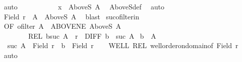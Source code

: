 \begin{isabellebody}
\ auto\isanewline
\ \ \ \isacommand{{\isacharbraceright}{\kern0pt}}\isamarkupfalse%
\isanewline
\ \ \ \isamarkupfalse%
\ {\isacharasterisk}{\kern0pt}\ \isamarkupfalse%
\ {\isachardoublequoteopen}x\ {\isasymin}\ AboveS\ A{\isachardoublequoteclose}\ \isamarkupfalse%
\ AboveS{\isacharunderscore}{\kern0pt}def\ \isamarkupfalse%
\ auto\isanewline
\ \ \isacommand{{\isacharbraceright}{\kern0pt}}\isamarkupfalse%
\isanewline
\ \ \isamarkupfalse%
\ {\isachardoublequoteopen}Field\ r\ {\isasymle}\ A\ {\isasymunion}\ {\isacharparenleft}{\kern0pt}AboveS\ A{\isacharparenright}{\kern0pt}{\isachardoublequoteclose}\ \isamarkupfalse%
\ blast\isanewline
{}\isamarkupfalse%
%
\endisatagproof
{\isafoldproof}%
%
\isadelimproof
\isanewline
%
\endisadelimproof
\isanewline
{}\isamarkupfalse%
\ suc{\isacharunderscore}{\kern0pt}ofilter{\isacharunderscore}{\kern0pt}in{\isacharcolon}{\kern0pt}\isanewline
{}\ OF{\isacharcolon}{\kern0pt}\ {\isachardoublequoteopen}ofilter\ A{\isachardoublequoteclose}\ \ ABOVE{\isacharunderscore}{\kern0pt}NE{\isacharcolon}{\kern0pt}\ {\isachardoublequoteopen}AboveS\ A\ {\isasymnoteq}\ {\isacharbraceleft}{\kern0pt}{\isacharbraceright}{\kern0pt}{\isachardoublequoteclose}\ \isanewline
\ \ \ \ \ \ \ \ REL{\isacharcolon}{\kern0pt}\ {\isachardoublequoteopen}{\isacharparenleft}{\kern0pt}b{\isacharcomma}{\kern0pt}suc\ A{\isacharparenright}{\kern0pt}\ {\isasymin}\ r{\isachardoublequoteclose}\ \ DIFF{\isacharcolon}{\kern0pt}\ {\isachardoublequoteopen}b\ {\isasymnoteq}\ suc\ A{\isachardoublequoteclose}\isanewline
{}\ {\isachardoublequoteopen}b\ {\isasymin}\ A{\isachardoublequoteclose}\isanewline
%
\isadelimproof
%
\endisadelimproof
%
\isatagproof
{}\isamarkupfalse%
{\isacharminus}{\kern0pt}\isanewline
\ \ \isamarkupfalse%
\ {\isacharasterisk}{\kern0pt}{\isacharcolon}{\kern0pt}\ {\isachardoublequoteopen}suc\ A\ {\isasymin}\ Field\ r\ {\isasymand}\ b\ {\isasymin}\ Field\ r{\isachardoublequoteclose}\isanewline
\ \ \isamarkupfalse%
\ WELL\ REL\ well{\isacharunderscore}{\kern0pt}order{\isacharunderscore}{\kern0pt}on{\isacharunderscore}{\kern0pt}domain{\isacharbrackleft}{\kern0pt}of\ {\isachardoublequoteopen}Field\ r{\isachardoublequoteclose}{\isacharbrackright}{\kern0pt}\ \isamarkupfalse%
\ auto\isanewline
\ \ \isacommand{{\isacharbraceleft}{\kern0pt}}\isamarkupfalse%
\isamarkupfalse%

\end{isabellebody}
